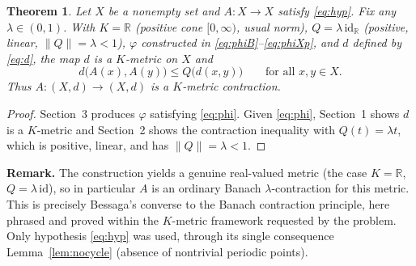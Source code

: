 \documentclass{amsart}
\newtheorem{theorem}{Theorem}
\theoremstyle{definition}
\begin{document}
\begin{theorem}
Let $X$ be a nonempty set and $A:X\to X$ satisfy \eqref{eq:hyp}. Fix any
$\lambda\in(0,1)$. With $K=\mathbb{R}$ (positive cone $[0,\infty)$, usual norm),
$Q=\lambda\,\mathrm{id}_{\mathbb{R}}$ (positive, linear, $\lVert
Q\rVert=\lambda<1$), $\varphi$ constructed in \eqref{eq:phiB}--\eqref{eq:phiXp},
and $d$ defined by \eqref{eq:d}, the map $d$ is a $K$-metric on $X$ and
\[
  d\bigl(A(x),A(y)\bigr)\le Q\bigl(d(x,y)\bigr)\qquad\text{for all }x,y\in X.
\]
Thus $A:(X,d)\to(X,d)$ is a $K$-metric contraction.
\end{theorem}
\begin{proof}
Section~3 produces $\varphi$ satisfying \eqref{eq:phi}. Given \eqref{eq:phi},
Section~1 shows $d$ is a $K$-metric and Section~2 shows the contraction inequality
with $Q(t)=\lambda t$, which is positive, linear, and has $\lVert
Q\rVert=\lambda<1$.
\end{proof}

\bigskip
\noindent\textbf{Remark.} The construction yields a genuine real-valued metric
(the case $K=\mathbb{R}$, $Q=\lambda\,\mathrm{id}$), so in particular $A$ is an
ordinary Banach $\lambda$-contraction for this metric. This is precisely Bessaga's
converse to the Banach contraction principle, here phrased and proved within the
$K$-metric framework requested by the problem. Only hypothesis \eqref{eq:hyp} was
used, through its single consequence Lemma~\ref{lem:nocycle} (absence of
nontrivial periodic points).
\end{document}
